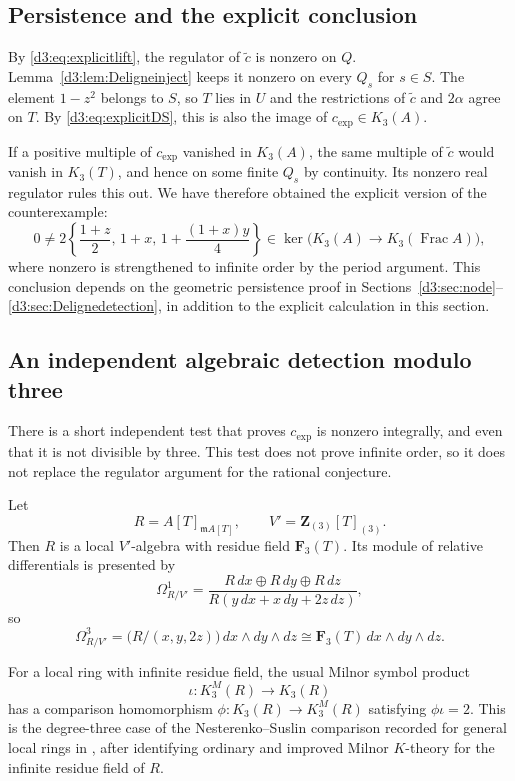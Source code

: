 \documentclass[11pt,a4paper]{amsart}
\numberwithin{equation}{section}
\theoremstyle{definition}
\theoremstyle{remark}
\newcommand{\Z}{\mathbf Z}
\newcommand{\F}{\mathbf F}
\newcommand{\m}{\mathfrak m}
\newcommand{\Frac}{\operatorname{Frac}}
\begin{document}
\subsection{Persistence and the explicit conclusion}
By \eqref{d3:eq:explicitlift}, the regulator of $\widetilde c$ is nonzero on $Q$. Lemma~\ref{d3:lem:Deligneinject} keeps it nonzero on every $Q_s$ for $s\in S$. The element $1-z^2$ belongs to $S$, so $T$ lies in $U$ and the restrictions of $\widetilde c$ and $2\alpha$ agree on $T$. By \eqref{d3:eq:explicitDS}, this is also the image of $c_{\mathrm{exp}}\in K_3(A)$.

If a positive multiple of $c_{\mathrm{exp}}$ vanished in $K_3(A)$, the same multiple of $\widetilde c$ would vanish in $K_3(T)$, and hence on some finite $Q_s$ by continuity. Its nonzero real regulator rules this out. We have therefore obtained the explicit version of the counterexample:
\begin{equation}\label{d3:eq:explicitconclusion}
\boxed{\quad
0\neq 2\left\{\frac{1+z}{2},\,1+x,\,
1+\frac{(1+x)y}{4}\right\}\in
\ker\bigl(K_3(A)\longrightarrow K_3(\Frac A)\bigr),
\quad}
\end{equation}
where nonzero is strengthened to infinite order by the period argument. This conclusion depends on the geometric persistence proof in Sections~\ref{d3:sec:node}--\ref{d3:sec:Delignedetection}, in addition to the explicit calculation in this section.

\subsection{An independent algebraic detection modulo three}\label{d3:sec:modthree}

There is a short independent test that proves $c_{\mathrm{exp}}$ is nonzero integrally, and even that it is not divisible by three. This test does not prove infinite order, so it does not replace the regulator argument for the rational conjecture.

Let
\[
R=A[T]_{\m A[T]},\qquad V'=\Z_{(3)}[T]_{(3)}.
\]
Then $R$ is a local $V'$-algebra with residue field $\F_3(T)$. Its module of relative differentials is presented by
\[
\Omega^1_{R/V'}=
\frac{R\,dx\oplus R\,dy\oplus R\,dz}
 {R(y\,dx+x\,dy+2z\,dz)},
\]
so
\[
\Omega^3_{R/V'}=
\bigl(R/(x,y,2z)\bigr)\,dx\wedge dy\wedge dz
\cong\F_3(T)\,dx\wedge dy\wedge dz.
\]

For a local ring with infinite residue field, the usual Milnor symbol product
\[
\iota:K^M_3(R)\longrightarrow K_3(R)
\]
has a comparison homomorphism $\phi:K_3(R)\to K^M_3(R)$ satisfying $\phi\iota=2$. This is the degree-three case of the Nesterenko--Suslin comparison recorded for general local rings in \cite[Proposition~4.2.8(5),(6)]{KerzThesis}, after identifying ordinary and improved Milnor $K$-theory for the infinite residue field of $R$.
\end{document}
